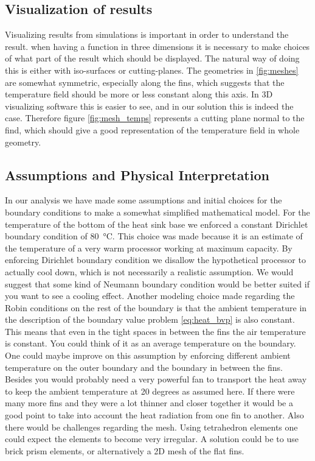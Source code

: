 \subsection{Visualization of results}
Visualizing results from simulations is important in order to understand the result. when having a function in three dimensions it is necessary to make choices of what part of the result which should be displayed. The natural way of doing this is either with iso-surfaces or cutting-planes. The geometries in \ref{fig:meshes} are somewhat symmetric, especially along the fins, which suggests that the temperature field should be more or less constant along this axis. In 3D visualizing software this is easier to see, and in our solution this is indeed the case. Therefore figure \ref{fig:mesh_temps} represents a cutting plane normal to the find, which should give a good representation of the temperature field in whole geometry.

\subsection{Assumptions and Physical Interpretation}
In our analysis we have made some assumptions and initial choices for the boundary conditions to make a somewhat simplified mathematical model. For the temperature of the bottom of the heat sink base we enforced a constant Dirichlet boundary condition of \SI{80}{\celsius}. This choice was made because it is an estimate of the temperature of a very warm processor working at maximum capacity. By enforcing Dirichlet boundary condition we disallow the hypothetical processor to actually cool down, which is not necessarily a realistic assumption. We would suggest that some kind of Neumann boundary condition would be better suited if you want to see a cooling effect. Another modeling choice made regarding the Robin conditions on the rest of the boundary is that the ambient temperature in the description of the boundary value problem \eqref{eq:heat_bvp} is also constant. This means that even in the tight spaces in between the fins the air temperature is constant. You could think of it as an average temperature on the boundary. One could maybe improve on this assumption by enforcing different ambient temperature on the outer boundary and the boundary in between the fins. Besides you would probably need a very powerful fan to transport the heat away to keep the ambient temperature at 20 degrees as assumed here.
If there were many more fins and they were a lot thinner and closer together it would be a good point to take into account the heat radiation from one fin to another. Also there would be challenges regarding the mesh. Using tetrahedron elements one could expect the elements to become very irregular. A solution could be to use brick prism elements, or alternatively a 2D mesh of the flat fins.